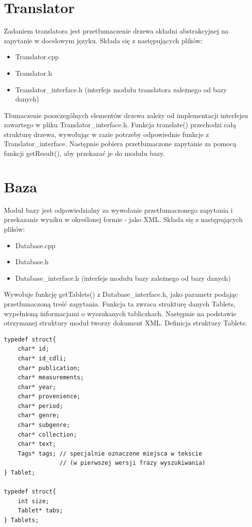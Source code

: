 \section{Translator}
Zadaniem translatora jest przetłumaczenie drzewa składni abstrakcyjnej na zapytanie w docelowym języku. 
Składa się z następujących plików:
\begin {itemize}
 \item Translator.cpp
 \item Translator.h
 \item Translator\_interface.h (interfejs modułu translatora zależnego od bazy danych)
\end {itemize}

Tłumaczenie poszczególnych elementów drzewa zależy od implementacji interfejsu zawartego w pliku Translator\_interface.h. 
Funkcja translate() przechodzi całą strukturę drzewa, wywołując w razie potrzeby odpowiednie funkcje z Translator\_interface.
Następnie pobiera przetłumaczone zapytanie za pomocą funkcji getResult(), aby przekazać je do modułu bazy.

\section{Baza}
Moduł bazy jest odpowiedzialny za wywołanie przetłumaczonego zapytania i przekazanie wyniku w określonej formie - jako XML.
Składa się z następujących plików:
\begin {itemize}
 \item Database.cpp
 \item Database.h
 \item Database\_interface.h (interfejs modułu bazy zależnego od bazy danych)
\end {itemize}

Wywołuje funkcję getTablets() z Database\_interface.h, jako parametr podając przetłumaczoną treść zapytania. 
Funkcja ta zwraca strukturę danych Tablets, wypełnioną informacjami o wyszukanych tabliczkach.
Następnie na podstawie otrzymanej struktury moduł tworzy dokument XML.
\newline
Definicja struktury Tablets:
\begin{verbatim}
typedef struct{    
    char* id;
    char* id_cdli;
    char* publication;
    char* measurements;
    char* year;
    char* provenience;
    char* period;
    char* genre;
    char* subgenre;
    char* collection;
    char* text;
    Tags* tags; // specjalnie oznaczone miejsca w tekscie
                // (w pierwszej wersji frazy wyszukiwania)
} Tablet;

typedef struct{
    int size;
    Tablet* tabs;
} Tablets;
\end{verbatim}

